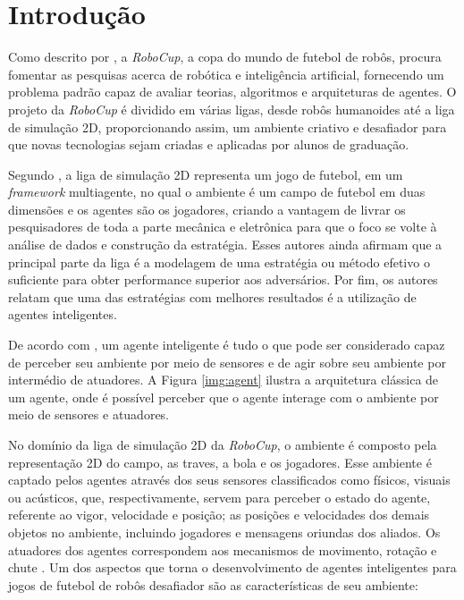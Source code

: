 \chapter{Introdução}

Como descrito por , a \textit{RoboCup}, a copa do mundo de futebol de
robôs, procura fomentar as pesquisas acerca de robótica e inteligência artificial, fornecendo um
problema padrão capaz de avaliar teorias, algoritmos e arquiteturas de agentes. O projeto da
\textit{RoboCup} é dividido em várias ligas, desde robôs humanoides até a liga de simulação 2D,
proporcionando assim, um ambiente criativo e desafiador para que novas tecnologias sejam criadas e
aplicadas por alunos de graduação.

Segundo , a liga de simulação 2D representa um jogo de futebol, em um
\textit{framework} multiagente, no qual o ambiente é um campo de futebol em duas dimensões e os
agentes são os jogadores, criando a vantagem de livrar os pesquisadores de toda a parte mecânica e
eletrônica para que o foco se volte à análise de dados e construção da estratégia.
Esses autores ainda afirmam que a principal parte da liga é a modelagem de uma
estratégia ou método efetivo o suficiente para obter performance superior aos adversários. Por fim,
os autores relatam que uma das estratégias com melhores resultados é a utilização de agentes
inteligentes.

De acordo com , um agente inteligente é tudo o que pode ser
considerado capaz de perceber seu ambiente por meio de sensores e de agir sobre seu ambiente por
intermédio de atuadores. A Figura \ref{img:agent} ilustra a arquitetura clássica de um agente, onde
é possível perceber que o agente interage com o ambiente por meio de sensores e atuadores.


No domínio da liga de simulação 2D da \textit{RoboCup}, o ambiente é composto pela representação 2D
do campo, as traves, a bola e os jogadores. Esse ambiente é captado pelos agentes através dos seus
sensores classificados como físicos, visuais ou acústicos, que, respectivamente, servem para
perceber o estado do agente, referente ao vigor, velocidade e posição; as posições e velocidades dos
demais objetos no ambiente, incluindo jogadores e mensagens oriundas dos aliados. Os atuadores dos
agentes correspondem aos mecanismos de movimento, rotação e chute
\cite{robocupfederationofficialwebsite}. Um dos aspectos que torna o desenvolvimento de agentes
inteligentes para jogos de futebol de robôs desafiador são as  características de seu ambiente:

